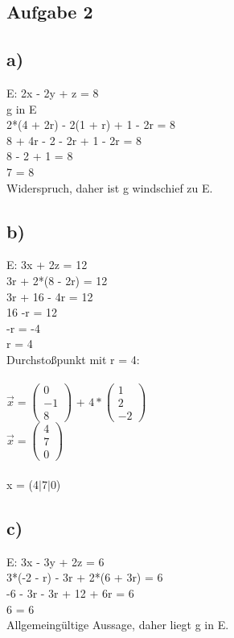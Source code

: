 \documentclass{article}
\begin{document}
	\subsection*{Aufgabe 2}
	\subsection*{a)}
	E: 2x - 2y + z = 8 \\
	g in E \\
	2*(4 + 2r) - 2(1 + r) + 1 - 2r = 8 \\
	8 + 4r - 2 - 2r + 1 - 2r = 8 \\
	8 - 2 + 1 = 8 \\
	7 = 8 \\
	Widerspruch, daher ist g windschief zu E.
	\subsection*{b)}
	E: 3x + 2z = 12 \\
	3r + 2*(8 - 2r) = 12 \\
	3r + 16 - 4r = 12 \\
	16 -r = 12 \\
	-r = -4 \\
	r = 4 \\
	Durchstoßpunkt mit r = 4: \\ \\
	$
	\vec{x} = 
	\left(\begin{array}{c}
	0 \\ -1 \\ 8
	\end{array}\right)
	$
	+
	$
	4 * 
	\left(\begin{array}{c}
	1 \\ 2 \\ -2
	\end{array}\right)
	$
	\\
	$
	\vec{x} = 
	\left(\begin{array}{c}
	4 \\ 7 \\ 0
	\end{array}\right)
	$ \\ \\
	x = (4$|$7$|$0)
	\subsection*{c)}
	E: 3x - 3y + 2z = 6 \\
	3*(-2 - r) - 3r + 2*(6 + 3r) = 6 \\
	-6 - 3r - 3r + 12 + 6r = 6 \\
	6 = 6 \\
	Allgemeingültige Aussage, daher liegt g in E.
\end{document}

